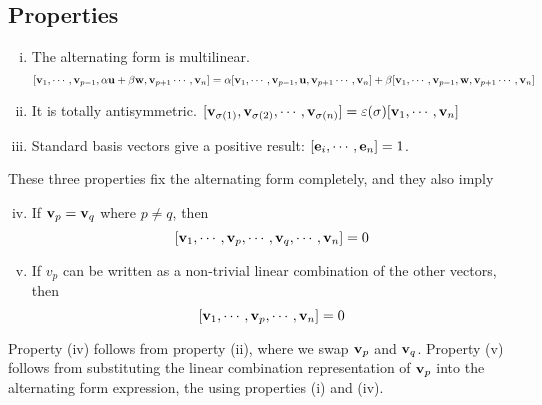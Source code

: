\subsection{Properties}
\begin{enumerate}[(i)]
	\item The alternating form is multilinear.
	      \[
		      [ \vb v_1, \cdots, \vb v_{p-1}, \alpha \vb u + \beta \vb w, \vb v_{p+1} \cdots, \vb v_n ] = \alpha [ \vb v_1, \cdots, \vb v_{p-1}, \vb u, \vb v_{p+1} \cdots, \vb v_n ] + \beta [ \vb v_1, \cdots, \vb v_{p-1}, \vb w, \vb v_{p+1} \cdots, \vb v_n ]
	      \]
	\item It is totally antisymmetric.
	      \([ \vb v_{\sigma(1)}, \vb v_{\sigma(2)}, \cdots, \vb v_{\sigma(n)} ] = \varepsilon(\sigma) [ \vb v_1, \cdots, \vb v_n ]\)
	\item Standard basis vectors give a positive result: \([\vb e_i, \cdots, \vb e_n] = 1\).
\end{enumerate}
These three properties fix the alternating form completely, and they also imply
\begin{enumerate}[(i)]
	\setcounter{enumi}{3}
	\item If \(\vb v_p = \vb v_q\) where \(p \neq q\), then
	      \[
		      [\vb v_1, \cdots, \vb v_p, \cdots, \vb v_q, \cdots, \vb v_n ] = 0
	      \]
	\item If \(v_p\) can be written as a non-trivial linear combination of the other vectors, then
	      \[
		      [\vb v_1, \cdots, \vb v_p, \cdots, \vb v_n ] = 0
	      \]
\end{enumerate}
Property (iv) follows from property (ii), where we swap \(\vb v_p\) and \(\vb v_q\).
Property (v) follows from substituting the linear combination representation of \(\vb v_p\) into the alternating form expression, the using properties (i) and (iv).
